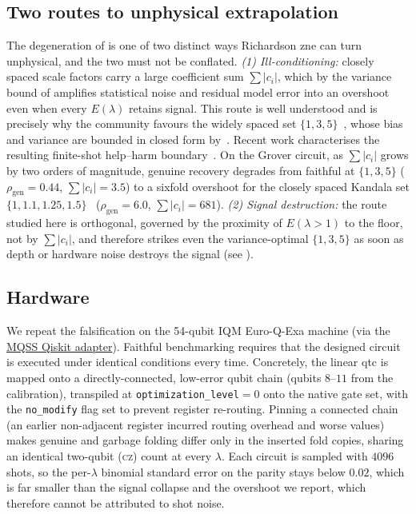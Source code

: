 \documentclass[10pt,conference, letterpaper]{IEEEtran}
\begin{document}
\subsection{Two routes to unphysical extrapolation}
\label{sec:spectrum}
The degeneration of  is one of two distinct ways Richardson \gls{zne} can turn unphysical, and the two must not be conflated. \emph{(1) Ill-conditioning:} closely spaced scale factors carry a large coefficient sum $\sum|c_i|$, which by the variance bound of  amplifies statistical noise and residual model error into an overshoot even when every $E(\lambda)$ retains signal. This route is well understood and is precisely why the community favours the widely spaced set $\{1,3,5\}$~\cite{giurgica-tiron_digital_2020,majumdar_best_2023,cai_quantum_2023}, whose bias and variance are bounded in closed form by~\cite{mohammadipour_direct_2025}. Recent work characterises the resulting finite-shot help--harm boundary~\cite{alfaro_finite-shot_2026}. On the Grover circuit, as $\sum|c_i|$ grows by two orders of magnitude, genuine recovery degrades from faithful at $\{1,3,5\}$ ($\rho_\text{gen}=0.44$, $\sum|c_i|=3.5$) to a sixfold overshoot for the closely spaced Kandala set $\{1,1.1,1.25,1.5\}$~\cite{kandala_error_2019} ($\rho_\text{gen}=6.0$, $\sum|c_i|=681$). \emph{(2) Signal destruction:} the route studied here is orthogonal, governed by the proximity of $E(\lambda{>}1)$ to the floor, not by $\sum|c_i|$, and therefore strikes even the variance-optimal $\{1,3,5\}$ as soon as depth or hardware noise destroys the signal (see ).

\subsection{Hardware}
\label{sec:hardware}
We repeat the falsification on the 54-qubit IQM Euro-Q-Exa machine (via the \href{https://munich-quantum-software-stack.github.io/MQSS-Interfaces/qiskit/index.html}{MQSS Qiskit adapter}). Faithful benchmarking requires that the designed circuit is executed under identical conditions every time. Concretely, the linear \gls{qtc} is mapped onto a directly-connected, low-error qubit chain (qubits $8\text{--}11$ from the calibration), transpiled at \texttt{optimization\_level}${=}0$ onto the native gate set, with the \texttt{no\_modify} flag set to prevent register re-routing. Pinning a connected chain (an earlier non-adjacent register incurred routing overhead and worse values) makes genuine and garbage folding differ only in the inserted fold copies, sharing an identical two-qubit (\textsc{cz}) count at every $\lambda$. Each circuit is sampled with $4096$ shots, so the per-$\lambda$ binomial standard error on the parity stays below $0.02$, which is far smaller than the signal collapse and the overshoot we report, which therefore cannot be attributed to shot noise. 
\end{document}
